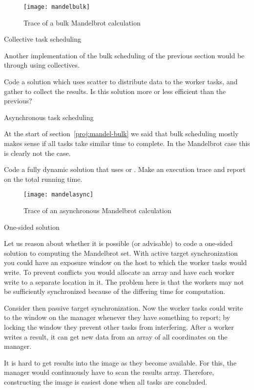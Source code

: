\begin{figure}[ht]
\texttt{[image: mandelbulk]}
\caption{Trace of a bulk Mandelbrot calculation}
\label{fig:mandel-bulk}
\end{figure}

 {Collective task scheduling}
\label{proj:mandel-collective}

Another implementation of the bulk scheduling of the previous section
would be through using collectives.

\begin{exercise}
  Code a solution which uses scatter to distribute data to the worker
  tasks, and gather to collect the results. Is this solution more or
  less efficient than the previous?
\end{exercise}

 {Asynchronous task scheduling}

At the start of section~\ref{proj:mandel-bulk} we said that bulk scheduling
mostly makes sense if all tasks take similar time to complete.
In the Mandelbrot case this is clearly not the case.

\begin{exercise}
  Code a fully dynamic solution that uses  or .
  Make an execution trace and report on the total running time.
\end{exercise}

\begin{figure}[ht]
\texttt{[image: mandelasync]}
\caption{Trace of an asynchronous Mandelbrot calculation}
\label{fig:mandel-async}
\end{figure}

 {One-sided solution}

Let us reason about whether it is possible (or advisable) to code a
one-sided solution to computing the Mandelbrot set.  
%
With active
target synchronization you could have an exposure window on the host
to which the worker tasks would write. To prevent conflicts you would allocate an 
array and have each worker write to a separate location in it.
%
The problem here is that the workers may not be sufficiently synchronized because
of the differing time for computation.

Consider then passive target synchronization. Now the worker tasks could
write to the window on the manager whenever they have something to
report; by locking the window they prevent other tasks from interfering.
%
After a worker writes a result, it can get new data from an array
of all coordinates on the manager. 

It is hard to get results into the image as they become available. For
this, the manager would continuously have to scan the results
array. Therefore, constructing the image is easiest done when all
tasks are concluded.
